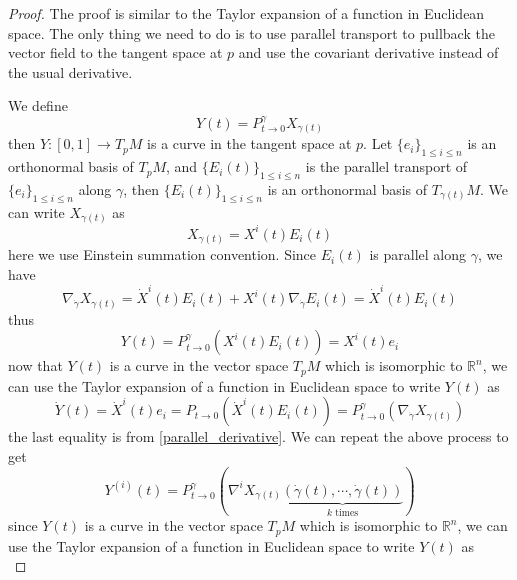 \documentclass[12pt,a4paper,draft]{article}  %
\theoremstyle{definition}
\numberwithin{equation}{section}
\newcommand{\RR}{\mathbb{R}}
\begin{document}
\begin{proof}
        The proof is similar to the Taylor expansion of a function in Euclidean space. The only thing we need to do is to use parallel transport to pullback the vector field to the tangent space at $p$ and use the covariant derivative instead of the usual derivative.

        We define
        \[
        Y(t) = P_{t\to0}^\gamma X_{\gamma(t)}
        \]
        then $Y:[0,1]\to T_pM$ is a curve in the tangent space at $p$. Let $\{e_i\}_{1\leq i \leq n}$ is an orthonormal basis of $T_p M$, and $\{E_i(t)\}_{1\leq i \leq n}$ is the parallel transport of $\{e_i\}_{1\leq i \leq n}$ along $\gamma$, then $\{E_i(t)\}_{1\leq i \leq n}$ is an orthonormal basis of $T_{\gamma(t)} M$. We can write $X_{\gamma(t)}$ as
        \[
        X_{\gamma(t)} = X^i(t) E_i(t)
        \]
        here we use Einstein summation convention. Since $E_i(t)$ is parallel along $\gamma$, we have
        \begin{equation}\label{parallel_derivative}
                \nabla_{\dot{\gamma}} X_{\gamma(t)} = \dot{X}^i(t) E_i(t) + X^i(t) \nabla_{\dot{\gamma}} E_i(t) = \dot{X}^i(t) E_i(t)
        \end{equation}
        thus
        \begin{equation}
                Y(t) = P_{t\to0}^\gamma \left(X^i(t) E_i(t)\right) = X^i(t) e_i
        \end{equation}
        now that $Y(t)$ is a curve in the vector space $T_p M$ which is isomorphic to $\RR^n$, we can use the Taylor expansion of a function in Euclidean space to write $Y(t)$ as
        \begin{equation}
                \dot{Y}(t) = \dot{X}^i(t) e_i = P_{t\to 0}\left(\dot{X}^i(t) E_i(t)\right) = P_{t\to0}^\gamma \left(\nabla_{\dot{\gamma}} X_{\gamma(t)}\right) 
        \end{equation}
        the last equality is from \eqref{parallel_derivative}. We can repeat the above process to get
        \begin{equation}\label{higher_derivative}
                Y^{(i)}(t) = P_{t\to0}^\gamma \left(\nabla^i X_{\gamma(t)}\underbrace{(\dot{\gamma}(t),\cdots,\dot{\gamma}(t))}_{k\text{ times}}\right)
        \end{equation}
        since $Y(t)$ is a curve in the vector space $T_p M$ which is isomorphic to $\RR^n$, we can use the Taylor expansion of a function in Euclidean space to write $Y(t)$ as
        \begin{equation}\label{taylor_in_euclidean}                

\end{equation}
\end{proof}
\end{document}

